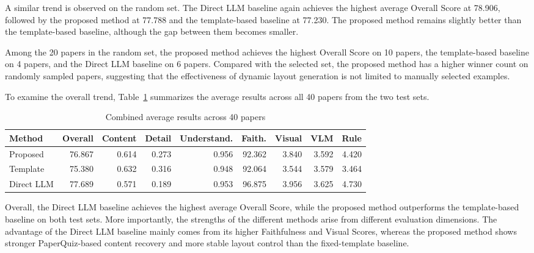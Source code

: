 \documentclass[12pt,oneside]{report}
\begin{document}
\vspace{1em}

A similar trend is observed on the random set. The Direct LLM baseline again achieves the highest average Overall Score at 78.906, followed by the proposed method at 77.788 and the template-based baseline at 77.230. The proposed method remains slightly better than the template-based baseline, although the gap between them becomes smaller.

\vspace{1em}

Among the 20 papers in the random set, the proposed method achieves the highest Overall Score on 10 papers, the template-based baseline on 4 papers, and the Direct LLM baseline on 6 papers. Compared with the selected set, the proposed method has a higher winner count on randomly sampled papers, suggesting that the effectiveness of dynamic layout generation is not limited to manually selected examples.

\vspace{1em}

To examine the overall trend, Table~\ref{tab:combined_results} summarizes the average results across all 40 papers from the two test sets.

\begin{table}[H]
\centering
\small
\setlength{\tabcolsep}{4pt}
\renewcommand{\arraystretch}{1.2}
\caption{Combined average results across 40 papers}
\label{tab:combined_results}

\begin{tabularx}{\textwidth}{lrrrrrrrr}
\toprule
\textbf{Method} &
\textbf{Overall} &
\textbf{Content} &
\textbf{Detail} &
\textbf{Understand.} &
\textbf{Faith.} &
\textbf{Visual} &
\textbf{VLM} &
\textbf{Rule} \\
\midrule
Proposed & 76.867 & 0.614 & 0.273 & 0.956 & 92.362 & 3.840 & 3.592 & 4.420 \\
Template & 75.380 & 0.632 & 0.316 & 0.948 & 92.064 & 3.544 & 3.579 & 3.464 \\
Direct LLM & 77.689 & 0.571 & 0.189 & 0.953 & 96.875 & 3.956 & 3.625 & 4.730 \\
\bottomrule
\end{tabularx}
\end{table}

\vspace{1em}

Overall, the Direct LLM baseline achieves the highest average Overall Score, while the proposed method outperforms the template-based baseline on both test sets. More importantly, the strengths of the different methods arise from different evaluation dimensions. The advantage of the Direct LLM baseline mainly comes from its higher Faithfulness and Visual Scores, whereas the proposed method shows stronger PaperQuiz-based content recovery and more stable layout control than the fixed-template baseline.
\end{document}
